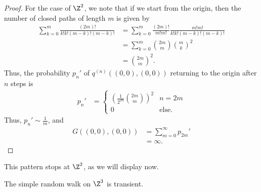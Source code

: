 \documentclass[10pt]{mypackage}
\begin{document}
\begin{proof}
  For the case of $\Z^2$, we note that if we start from the origin, then the number of closed paths of length $m$ is given by
  \begin{align*}
    \sum_{k=0}^{m}\frac{\left( 2m \right)!}{k!k!\left( m-k \right)!\left( m-k \right)!} &= \sum_{k=0}^{m} \frac{\left( 2m \right)!}{m!m!} \frac{m!m!}{k!k!\left( m-k \right)!\left( m-k \right)!}\\
                                          &= \sum_{k=0}^{m} {2m\choose m} {m\choose k}^2\\
                                          &= {2m\choose m}^2.
  \end{align*}
  Thus, the probability $p_n'$ of $q^{(n)}\left( \left( 0,0 \right),\left( 0,0 \right) \right)$ returning to the origin after $n$ steps is
  \begin{align*}
    p_n' &= \begin{cases}
      \left( \frac{1}{2^{2n}} {2m\choose m} \right)^2 & n=2m\\
      0 & \text{else}.
    \end{cases}
  \end{align*}
  Thus, $p_n'\sim \frac{1}{m}$, and
  \begin{align*}
    G\left( \left( 0,0 \right),\left( 0,0 \right) \right) &= \sum_{m=0}^{\infty}p_{2m}'\\
                                                          &= \infty.
  \end{align*}
\end{proof}
This pattern stops at $\Z^2$, as we will display now.
\begin{theorem}
  The simple random walk on $\Z^3$ is transient.
\end{theorem}
\end{document}

